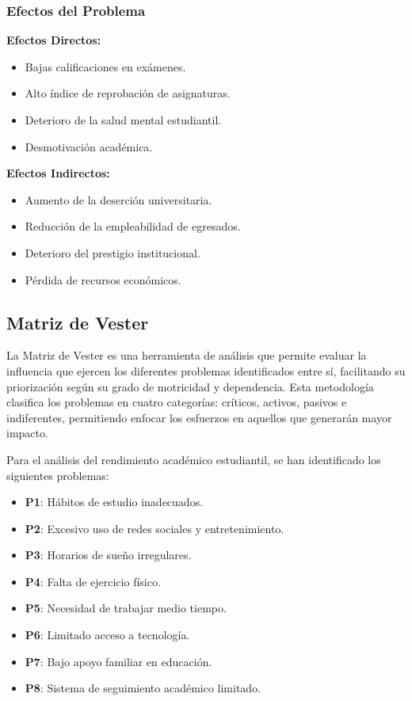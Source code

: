 \documentclass[12pt,letterpaper]{report}
\begin{document}
\subsubsection{Efectos del Problema}

\textbf{Efectos Directos:}
\vspace{0.1cm}
\begin{itemize}
    \item Bajas calificaciones en exámenes.
    \item Alto índice de reprobación de asignaturas.
    \item Deterioro de la salud mental estudiantil.
    \item Desmotivación académica.
\end{itemize}

\textbf{Efectos Indirectos:}
\vspace{0.1cm}
\begin{itemize}
    \item Aumento de la deserción universitaria.
    \item Reducción de la empleabilidad de egresados.
    \item Deterioro del prestigio institucional.
    \item Pérdida de recursos económicos.
\end{itemize}

\subsection{Matriz de Vester}

La Matriz de Vester es una herramienta de análisis que permite evaluar la influencia que ejercen los diferentes problemas identificados entre sí, facilitando su priorización según su grado de motricidad y dependencia. Esta metodología clasifica los problemas en cuatro categorías: críticos, activos, pasivos e indiferentes, permitiendo enfocar los esfuerzos en aquellos que generarán mayor impacto.

Para el análisis del rendimiento académico estudiantil, se han identificado los siguientes problemas:

\begin{itemize}
    \item \textbf{P1}: Hábitos de estudio inadecuados.
    \item \textbf{P2}: Excesivo uso de redes sociales y entretenimiento.
    \item \textbf{P3}: Horarios de sueño irregulares.
    \item \textbf{P4}: Falta de ejercicio físico.
    \item \textbf{P5}: Necesidad de trabajar medio tiempo.
    \item \textbf{P6}: Limitado acceso a tecnología.
    \item \textbf{P7}: Bajo apoyo familiar en educación.
    \item \textbf{P8}: Sistema de seguimiento académico limitado.
\end{itemize}
\end{document}
